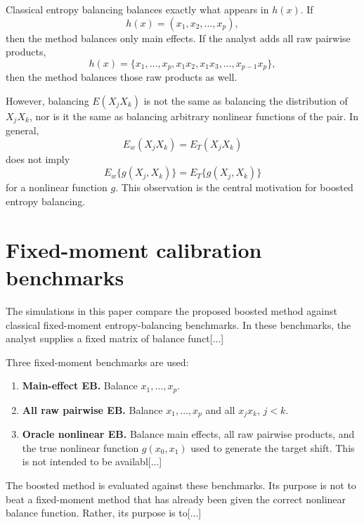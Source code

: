\documentclass[11pt]{article}
\begin{document}
Classical entropy balancing balances exactly what appears in $h(x)$. If
\begin{equation*}
h(x)=(x_1,x_2,\ldots,x_p),
\end{equation*}
then the method balances only main effects. If the analyst adds all raw pairwise products,
\begin{equation*}
h(x)=\{x_1,\ldots,x_p,x_1x_2,x_1x_3,\ldots,x_{p-1}x_p\},
\end{equation*}
then the method balances those raw products as well.

However, balancing $E(X_jX_k)$ is not the same as balancing the distribution of $X_jX_k$, nor is it the same as balancing arbitrary nonlinear functions of the pair. In general,
\begin{equation*}
E_w(X_jX_k)=E_T(X_jX_k)
\end{equation*}
does not imply
\begin{equation*}
E_w\{g(X_j,X_k)\}=E_T\{g(X_j,X_k)\}
\end{equation*}
for a nonlinear function $g$. This observation is the central motivation for boosted entropy balancing.

\section{Fixed-moment calibration benchmarks}

The simulations in this paper compare the proposed boosted method against classical fixed-moment entropy-balancing benchmarks. In these benchmarks, the analyst supplies a fixed matrix of balance funct[...] 

Three fixed-moment benchmarks are used:
\begin{enumerate}[leftmargin=2em]
\item \textbf{Main-effect EB.} Balance $x_1,\ldots,x_p$.
\item \textbf{All raw pairwise EB.} Balance $x_1,\ldots,x_p$ and all $x_jx_k$, $j<k$.
\item \textbf{Oracle nonlinear EB.} Balance main effects, all raw pairwise products, and the true nonlinear function $g(x_0,x_1)$ used to generate the target shift. This is not intended to be availabl[...]
\end{enumerate}

The boosted method is evaluated against these benchmarks. Its purpose is not to beat a fixed-moment method that has already been given the correct nonlinear balance function. Rather, its purpose is to[...]
\end{document}

